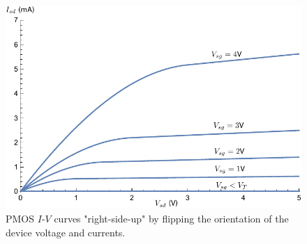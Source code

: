 \begin{figure}[H]
\centering
\includegraphics[width=\columnwidth]{ids_pmos_negative}
\caption{PMOS $I$-$V$ curves "right-side-up" by flipping the orientation of the device voltage and currents.}
\label{fig:ids_pmos_negative}
\end{figure}
